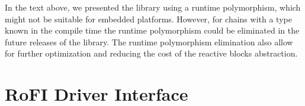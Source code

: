 In the text above, we presented the library using a runtime polymorphism, which
might not be suitable for embedded platforms. However, for chains with a type
known in the compile time the runtime polymorphism could be eliminated in the
future releases of the library. The runtime polymorphism elimination also allow
for further optimization and reducing the cost of the reactive blocks
abstraction.

\section{RoFI Driver Interface}
